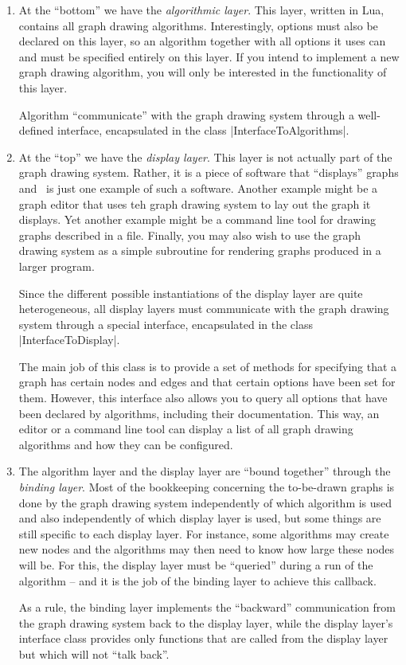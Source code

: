 \begin{enumerate}
\item At the ``bottom'' we have the \emph{algorithmic layer}. This
  layer, written in Lua, contains all graph drawing
  algorithms. Interestingly, options must also be declared on this
  layer, so an algorithm together with all options it uses can and
  must be specified entirely on this layer.
  If you intend to implement a new graph drawing algorithm, you will
  only be interested in the functionality of this layer.

  Algorithm ``communicate'' with the graph drawing system through
  a well-defined interface, encapsulated in the class
  |InterfaceToAlgorithms|.
\item At the ``top'' we have the \emph{display layer}. This layer is
  not actually part of the graph drawing system. Rather, it is a piece
  of software that ``displays'' graphs and \tikzname\ is just one
  example of such a software. Another example might be a graph
  editor that uses teh graph drawing system to lay out the graph it
  displays. Yet another example might be a command line tool for
  drawing graphs described in a file. Finally, you may also wish to
  use the graph drawing system as a simple subroutine for rendering
  graphs produced in a larger program.

  Since the different possible instantiations of the display layer are
  quite heterogeneous, all display layers must communicate with the
  graph drawing system through a special interface, encapsulated in
  the class |InterfaceToDisplay|.

  The main job of this class is to provide a set of methods for
  specifying that a graph has certain nodes and edges and that certain
  options have been set for them. However, this interface also allows
  you to query all options that have been declared by algorithms,
  including their documentation. This
  way, an editor or a command line tool can display a list of all
  graph drawing algorithms and how they can be configured.
\item
  The algorithm layer and the display layer are ``bound together''
  through the \emph{binding layer}. Most of the bookkeeping concerning
  the to-be-drawn graphs is done by the graph drawing system
  independently of which algorithm is used and also independently of
  which display layer is used, but some things are still specific to
  each display layer. For instance, some algorithms may create new
  nodes and the algorithms may then need to know how large these nodes
  will be. For this, the display layer must be ``queried'' during a
  run of the algorithm -- and it is the job of the binding layer to
  achieve this callback.
  
  As a rule, the binding layer implements the ``backward''
  communication from the graph drawing system back to the display
  layer, while the display layer's interface class provides only
  functions that are called from the display layer but which will not
  ``talk back''.
\end{enumerate}

